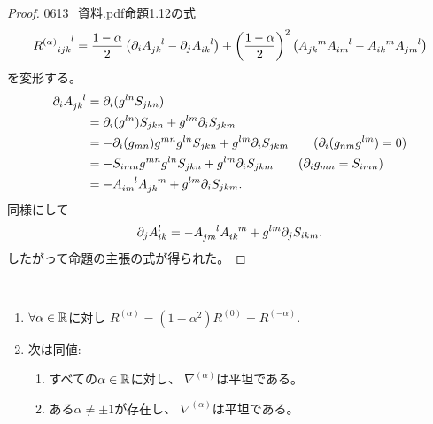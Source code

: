 \documentclass[report]{jlreq}
\begin{document}
\begin{proof}
    \url{0613_資料.pdf}命題1.12の式
    \begin{equation}
        {R^{(\alpha)}}_{ijk}^{\hphantom{ijk}l}
            = \frac{1 - \alpha}{2} \left({
                \partial_i A_{jk}^{\hphantom{jk}l}
                -
                \partial_j A_{ik}^{\hphantom{ik}l}
            }\right)
            + \left({\frac{1 - \alpha}{2}}\right)^2
            \left({
                A_{jk}^{\hphantom{jk}m} A_{im}^{\hphantom{im}l}
                -
                A_{ik}^{\hphantom{ik}m} A_{jm}^{\hphantom{jm}l}
            }\right)
    \end{equation}
    を変形する。
    \begin{alignat}{1}
        \partial_i A_{jk}^{\hphantom{jk}l}
            &=
                \partial_i (g^{ln} S_{jkn})
                \\
            &=
                \partial_i (g^{ln}) S_{jkn}
                +
                g^{lm} \partial_i S_{jkm}
                \\
            &=
                - \partial_i (g_{mn}) g^{mn} g^{ln} S_{jkn}
                +
                g^{lm} \partial_i S_{jkm}
                \qquad
                (\partial_i(g_{nm} g^{lm}) = 0)
                \\
            &=
                - S_{imn} g^{mn} g^{ln} S_{jkn}
                +
                g^{lm} \partial_i S_{jkm}
                \qquad
                (\partial_i g_{mn} = S_{imn})
                \\
            &=
                - A_{im}^{\hphantom{im}l} A_{jk}^{\hphantom{jk}m}
                + g^{lm} \partial_i S_{jkm}.
    \end{alignat}
    同様にして
    \begin{alignat}{1}
        \partial_j A_{ik}^l
            =
                - A_{jm}^{\hphantom{jm}l} A_{ik}^{\hphantom{ik}m}
                + g^{lm} \partial_j S_{ikm}.
    \end{alignat}
    したがって命題の主張の式が得られた。
\end{proof}

\begin{corollary}
    ~
    \begin{enumerate}
        \item $\forall \alpha \in \mathbb{R}$に対し
            $R^{(\alpha)}
                =
                    (1 - \alpha^2)
                    R^{(0)}
                =
                    R^{(-\alpha)}$.
        \item 次は同値:
            \begin{enumerate}
                \item すべての$\alpha \in \mathbb{R}$に対し、
                    $\nabla^{(\alpha)}$は平坦である。
                \item ある$\alpha \neq \pm 1$が存在し、
                    $\nabla^{(\alpha)}$は平坦である。
            \end{enumerate}
    \end{enumerate}
\end{corollary}
\end{document}
